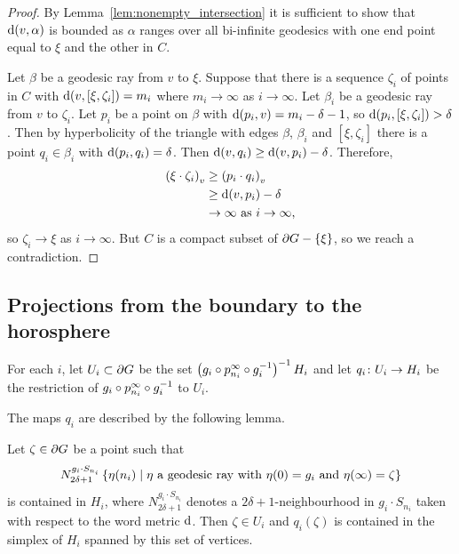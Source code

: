 \documentclass[a4paper]{article}
\begin{document}
\begin{proof}
  By Lemma~\ref{lem:nonempty_intersection} it is sufficient to show that
  $\dist(v, \alpha)$ is bounded as $\alpha$ ranges over all bi-infinite
  geodesics with one end point equal to $\xi$ and the other in $C$.

  Let $\beta$ be a geodesic ray from $v$ to $\xi$. Suppose that there is a
  sequence $\zeta_i$ of points in $C$ with $\dist(v, [\xi, \zeta_i]) = m_i$
  where $m_i \to \infty$ as $i\to \infty$. Let $\beta_i$ be a geodesic ray from
  $v$ to $\zeta_i$. Let $p_i$ be a point on $\beta$ with $\dist(p_i, v) = m_i -
  \delta - 1$, so $\dist(p_i, [\xi, \zeta_i]) > \delta$. Then by hyperbolicity
  of the triangle with edges $\beta$, $\beta_i$ and $[\xi, \zeta_i]$ there is a
  point $q_i \in \beta_i$ with $\dist(p_i, q_i) = \delta$. Then $\dist(v, q_i)
  \geq \dist(v, p_i) - \delta$. Therefore,
  \begin{align*}
    \gromov{v}{\xi}{\zeta_i} &\geq \gromov{v}{p_i}{q_i} \\
                             &\geq \dist(v, p_i) - \delta\\
                             &\to \infty \text{ as $i\to\infty$},
  \end{align*}
  so $\zeta_i\to\xi$ as $i\to\infty$. But $C$ is a compact subset of $\boundary
  G - \set\xi$, so we reach a contradiction.
\end{proof}

\subsection{Projections from the boundary to the horosphere}

\begin{definition}
  For each $i$, let $U_i \subset \boundary G$ be the set $\left(g_i \composed
  p^\infty_{n_i} \composed g_i^{-1}\right)^{-1} H_i$ and let $q_i \from U_i \to
  H_i$ be the restriction of $g_i \composed p^\infty_{n_i}\composed g_i^{-1}$
  to $U_i$.
\end{definition}

The maps $q_i$ are described by the following lemma.

\begin{lemma}\label{lem:describing_q_i}
  Let $\zeta \in \boundary G$ be a point such that
  \begin{equation*}
    N_{2\delta+1}^{g_i\cdot S_{n_i}} \set{\eta(n_i)\suchthat\text{$\eta$ a geodesic ray with
        $\eta(0) = g_i$ and $\eta(\infty) = \zeta$}}
  \end{equation*}
  is contained in $H_i$, where $N_{2\delta+1}^{g_i\cdot S_{n_i}}$ denotes a
  $2\delta+1$-neighbourhood in $g_i\cdot S_{n_i}$ taken with respect to the
  word metric $\dist$.  Then $\zeta \in U_i$ and $q_i(\zeta)$ is contained in
  the simplex of $H_i$ spanned by this set of vertices.
\end{lemma}
\end{document}
